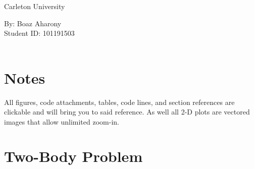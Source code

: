 \documentclass[hidelinks, 12pt]{article}%
\begin{document}
    \setcounter{page}{0}
    \begin{center}
        \vspace*{1cm}
        {\fontsize{300}{50}\selectfont {\bfseries AERO 3240 Term Assignment\\}}
        \vspace{3cm}
        {\LARGE Carleton University \\}
        \vspace{8cm}
    \end{center}
    \begin{center}
        By: 
        Boaz Aharony\\ \vspace{10pt}
        Student ID: 
        101191503\\ \vspace{10pt}
        \\
    \end{center}
    \thispagestyle{empty}

    \clearpage

    \section*{Notes}
    All figures, code attachments, tables, code lines, and section references are clickable and will bring you to said reference. As well all 2-D plots are vectored images that allow unlimited zoom-in.
    
    \tableofcontents
    
    \clearpage
    
    \listoffigures
    \listoftables
    \lstlistoflistings
    
    \clearpage
    


\setcounter{section}{1}
    \section{Two-Body Problem}
    
    \setcounter{subsection}{4}
\end{document}
